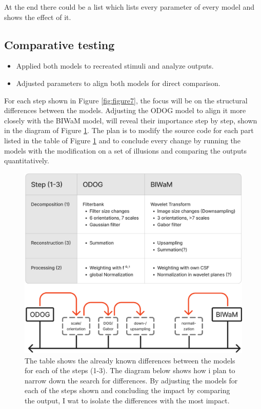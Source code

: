 At the end there could be a list which lists every parameter of every model and shows the
effect of it.

\subsection*{Comparative testing}
\begin{itemize}
    \item Applied both models to recreated stimuli and analyze outputs.
    \item Adjusted parameters to align both models for direct comparison.
\end{itemize}

\newpage

For each step shown in Figure \ref{fig:figure7}, the focus will be on the structural
differences between the models. Adjusting the ODOG model to align it more closely with the
BIWaM model, will reveal their importance step by step, shown in the diagram of Figure
\ref{fig:figure8}. The plan is to modify the source code for each part listed in the table
of Figure \ref*{fig:figure8} and to conclude every change by running the models with the
modification on a set of illusions and comparing the outputs quantitatively.

\begin{figure}[H]
    \centering
    \includegraphics[width=\linewidth]{media/table_differences.png}
    \begin{minipage}{0.8\textwidth}
    \caption{The table shows the already known differences between the models for each of
    the steps (1-3). The diagram below shows how i plan to narrow down the search for
    differences. By adjusting the models for each of the steps shown and concluding the
    impact by comparing the output, I wat to isolate the differences with the most
    impact.}
    \label{fig:figure8}
    \end{minipage}
\end{figure}



